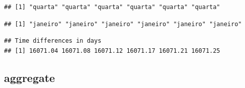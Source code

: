 \documentclass[]{book}
\newenvironment{Shaded}{\begin{snugshade}}{\end{snugshade}}
\newcommand{\KeywordTok}[1]{\textcolor[rgb]{0.13,0.29,0.53}{\textbf{#1}}}
\newcommand{\StringTok}[1]{\textcolor[rgb]{0.31,0.60,0.02}{#1}}
\newcommand{\OperatorTok}[1]{\textcolor[rgb]{0.81,0.36,0.00}{\textbf{#1}}}
\newcommand{\NormalTok}[1]{#1}
\theoremstyle{definition}
\theoremstyle{definition}
\theoremstyle{definition}
\theoremstyle{remark}
\begin{document}
\begin{Shaded}
\end{Shaded}

\begin{verbatim}
## [1] "quarta" "quarta" "quarta" "quarta" "quarta" "quarta"
\end{verbatim}

\begin{Shaded}
\end{Shaded}

\begin{verbatim}
## [1] "janeiro" "janeiro" "janeiro" "janeiro" "janeiro" "janeiro"
\end{verbatim}

\begin{Shaded}
\end{Shaded}

\begin{verbatim}
## Time differences in days
## [1] 16071.04 16071.08 16071.12 16071.17 16071.21 16071.25
\end{verbatim}

\begin{Shaded}
\end{Shaded}

\subsection{aggregate}\label{aggregate}
\end{document}
